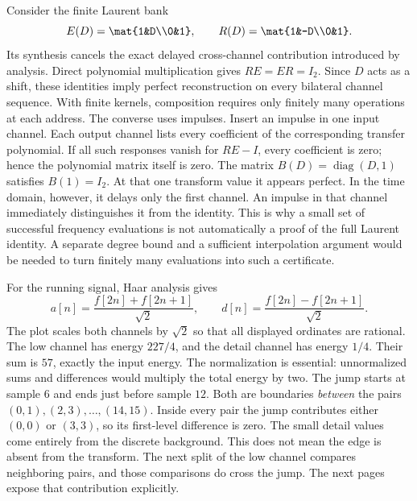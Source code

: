 Consider the finite Laurent bank
\[
E(D)=\mat{1&D\\0&1},\qquad
R(D)=\mat{1&-D\\0&1}.
\]
Its synthesis cancels the exact delayed cross-channel contribution introduced by analysis.
Direct polynomial multiplication gives $RE=ER=I_2$. Since $D$ acts as a shift, these identities imply perfect reconstruction on every bilateral channel sequence. With finite kernels, composition requires only finitely many operations at each address.
The converse uses impulses. Insert an impulse in one input channel. Each output channel lists every coefficient of the corresponding transfer polynomial. If all such responses vanish for $RE-I$, every coefficient is zero; hence the polynomial matrix itself is zero.
The matrix $B(D)=\operatorname{diag}(D,1)$ satisfies $B(1)=I_2$. At that one transform value it appears perfect. In the time domain, however, it delays only the first channel. An impulse in that channel immediately distinguishes it from the identity.
This is why a small set of successful frequency evaluations is not automatically a proof of the full Laurent identity. A separate degree bound and a sufficient interpolation argument would be needed to turn finitely many evaluations into such a certificate.

For the running signal, Haar analysis gives
\[
a[n]=\frac{f[2n]+f[2n+1]}{\sqrt2},\qquad
d[n]=\frac{f[2n]-f[2n+1]}{\sqrt2}.
\]
The plot scales both channels by $\sqrt2$ so that all displayed ordinates are rational.
The low channel has energy $227/4$, and the detail channel has energy $1/4$. Their sum is $57$, exactly the input energy. The normalization is essential: unnormalized sums and differences would multiply the total energy by two.
The jump starts at sample $6$ and ends just before sample $12$. Both are boundaries \emph{between} the pairs $(0,1),(2,3),\ldots,(14,15)$. Inside every pair the jump contributes either $(0,0)$ or $(3,3)$, so its first-level difference is zero. The small detail values come entirely from the discrete background.
This does not mean the edge is absent from the transform. The next split of the low channel compares neighboring pairs, and those comparisons do cross the jump. The next pages expose that contribution explicitly.

